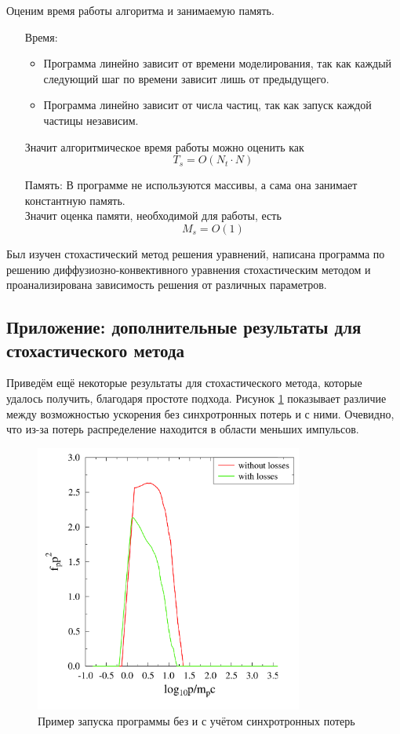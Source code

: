 \documentclass[a4paper,14pt]{extarticle} %
\begin{document}
Оценим время работы алгоритма и занимаемую память.
\begin{enumerate}
\item[Время:] 
\begin{itemize}
\item Программа линейно зависит от времени моделирования, так как каждый следующий шаг по времени зависит лишь от предыдущего.
\item Программа линейно зависит от числа частиц, так как запуск каждой частицы независим.
\end{itemize}
Значит алгоритмическое время работы можно оценить как 
\begin{equation}
T_s = O(N_t\cdot N)
\label{Ts}
\end{equation}
\item[Память:] В программе не используются массивы, а сама она занимает константную память.\\
Значит оценка памяти, необходимой для работы, есть
\begin{equation}
M_s=O(1)
\label{Ms}
\end{equation}
\end{enumerate}

Был изучен стохастический метод решения уравнений, написана программа по решению диффузиозно-конвективного уравнения стохастическим методом и проанализирована зависимость решения от различных параметров.

\subsection{Приложение: дополнительные результаты для стохастического метода}
Приведём ещё некоторые результаты для стохастического метода, которые удалось получить, благодаря простоте подхода.
Рисунок \ref{res/stoh/sinh} показывает различие между возможностью ускорения без синхротронных потерь и с ними. Очевидно, что из-за потерь распределение находится в области меньших импульсов. 
\begin{figure}[H]
\centering
\includegraphics[width=250pt]{stoh_sinh_or_not}
\caption{Пример запуска программы без и с учётом синхротронных потерь}
\label{res/stoh/sinh}
\end{figure}
\end{document}
